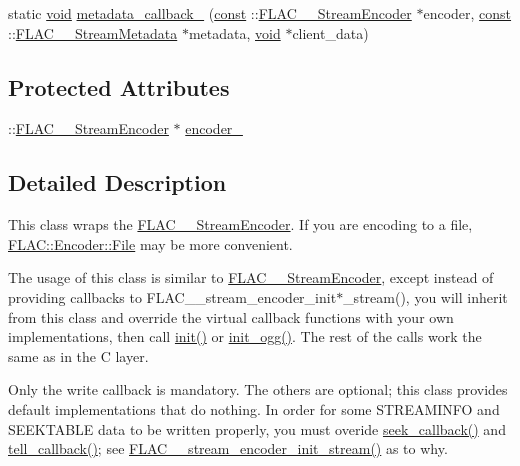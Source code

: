\begin{DoxyCompactItemize}
\item 
static \hyperlink{sound_8c_ae35f5844602719cf66324f4de2a658b3}{void} \hyperlink{class_f_l_a_c_1_1_encoder_1_1_stream_abe1facc2a279e86de213bd4e251c14cd}{metadata\+\_\+callback\+\_\+} (\hyperlink{getopt1_8c_a2c212835823e3c54a8ab6d95c652660e}{const} \+::\hyperlink{struct_f_l_a_c_____stream_encoder}{F\+L\+A\+C\+\_\+\+\_\+\+Stream\+Encoder} $\ast$encoder, \hyperlink{getopt1_8c_a2c212835823e3c54a8ab6d95c652660e}{const} \+::\hyperlink{struct_f_l_a_c_____stream_metadata}{F\+L\+A\+C\+\_\+\+\_\+\+Stream\+Metadata} $\ast$metadata, \hyperlink{sound_8c_ae35f5844602719cf66324f4de2a658b3}{void} $\ast$client\+\_\+data)
\end{DoxyCompactItemize}
\subsection*{Protected Attributes}
\begin{DoxyCompactItemize}
\item 
\+::\hyperlink{struct_f_l_a_c_____stream_encoder}{F\+L\+A\+C\+\_\+\+\_\+\+Stream\+Encoder} $\ast$ \hyperlink{class_f_l_a_c_1_1_encoder_1_1_stream_a03e8958f69a5b8fe1637ca4a758d80f8}{encoder\+\_\+}
\end{DoxyCompactItemize}


\subsection{Detailed Description}
This class wraps the \hyperlink{struct_f_l_a_c_____stream_encoder}{F\+L\+A\+C\+\_\+\+\_\+\+Stream\+Encoder}. If you are encoding to a file, \hyperlink{class_f_l_a_c_1_1_encoder_1_1_file}{F\+L\+A\+C\+::\+Encoder\+::\+File} may be more convenient. 

The usage of this class is similar to \hyperlink{struct_f_l_a_c_____stream_encoder}{F\+L\+A\+C\+\_\+\+\_\+\+Stream\+Encoder}, except instead of providing callbacks to F\+L\+A\+C\+\_\+\+\_\+stream\+\_\+encoder\+\_\+init$\ast$\+\_\+stream(), you will inherit from this class and override the virtual callback functions with your own implementations, then call \hyperlink{class_f_l_a_c_1_1_encoder_1_1_stream_ad39dffdff05aa5e75bffb0bf897bf097}{init()} or \hyperlink{class_f_l_a_c_1_1_encoder_1_1_stream_a78c593ff0e5b59804a9e629799e18036}{init\+\_\+ogg()}. The rest of the calls work the same as in the C layer.

Only the write callback is mandatory. The others are optional; this class provides default implementations that do nothing. In order for some S\+T\+R\+E\+A\+M\+I\+N\+FO and S\+E\+E\+K\+T\+A\+B\+LE data to be written properly, you must overide \hyperlink{class_f_l_a_c_1_1_encoder_1_1_stream_a2574a6f512b4b309327fd9f36b748d96}{seek\+\_\+callback()} and \hyperlink{class_f_l_a_c_1_1_encoder_1_1_stream_a448456ca34bb7b0a00d2299ab9b39a5e}{tell\+\_\+callback()}; see \hyperlink{group__flac__stream__encoder_ga85221c4ceb9f22dfd4983d8f07a9a35b}{F\+L\+A\+C\+\_\+\+\_\+stream\+\_\+encoder\+\_\+init\+\_\+stream()} as to why. 

